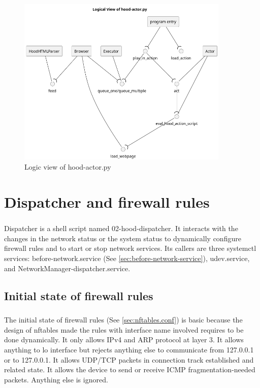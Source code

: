 \documentclass[mscthesis]{usiinfthesis}
\begin{document}
\begin{figure}[H]
  \includegraphics[width=0.9\textwidth]{graphics/puml/actor.png}
  \caption{Logic view of hood-actor.py}
  \label{fig:actor-logic-view}
\end{figure}

\chapter{Dispatcher and firewall rules}\label{cha:dispatcher}
\paragraph{}
Dispatcher is a shell script named 02-hood-dispatcher. It interacts with the changes in the network status or the system status to dynamically configure firewall rules and to start or stop network services. Its callers are three systemctl services: before-network.service (See \cref{sec:before-network-service}), udev.service, and NetworkManager-dispatcher.service.

\section{Initial state of firewall rules}
\paragraph{}
The initial state of firewall rules (See \cref{sec:nftables.conf}) is basic because the design of nftables made the rules with interface name involved requires to be done dynamically. It only allows IPv4 and ARP protocol at layer 3. It allows anything to lo interface but rejects anything else to communicate from 127.0.0.1 or to 127.0.0.1. It allows UDP/TCP packets in connection track established and related
state. It allows the device to send or receive ICMP fragmentation-needed packets. Anything else is ignored.
\end{document}
